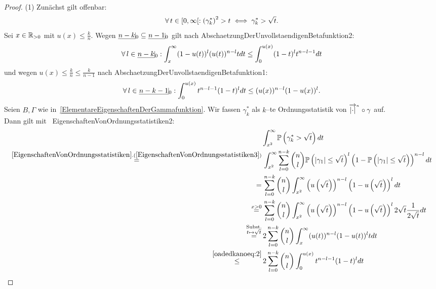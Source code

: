 \begin{proof}
(1) Zunächst gilt offenbar:
\begin{align}
\forall\, t \in [0, \infty[: \left(\gamma_k^\ast\right)^2 > t \iff
\gamma_k^\ast > \sqrt t \text.\label{oadedkanoeq:1}
\end{align}
Sei $x \in \mathbb{R}_{>0}$ mit $u(x) \le\frac k n $.
Wegen $\haken{n-k}_0 \subseteq \haken {n-1}_0$ gilt nach
{AbschaetzungDerUnvollstaendigenBetafunktion2}:
\begin{align}\forall\, l \in \haken {n-k}_0:
\int_x^\infty (1-u(t))^l(u(t))^{n-l}tdt
\le \int_0^{u(x)} (1-t)^lt^{n-l-1}dt \label{oadedkanoeq:2}
\end{align}
und wegen $u(x) \le \frac k n \le \frac k {n-1}$ nach
{AbschaetzungDerUnvollstaendigenBetafunktion1}:
\begin{align}\forall\, l \in \haken{n-k-1}_0:
\int_0^{u(x)} t^{n-l-1}(1-t)^ldt
\le (u(x))^{n-l}(1-u(x))^l \text.\label{oadedkanoeq:3}
\end{align}
Seien $B, \Gamma$ wie in~\ref{ElementareEigenschaftenDerGammafunktion}.
Wir fassen $\gamma_k^\ast$ als $k$--te Ordnungsstatistik von
${\overrightarrow{\left|\cdot\right|}}^{{}_n} \circ \gamma$ auf.\\
Dann gilt mit~
{EigenschaftenVonOrdnungsstatistiken2}:
\begin{align*}
& \int_{x^2}^\infty \Prim\left(\gamma_k^\ast > \sqrt t\right)dt\\
\overset{\refclaim{EigenschaftenVonOrdnungsstatistiken}
{EigenschaftenVonOrdnungsstatistiken3}}= &\,
\int_{x^2}^\infty \sum_{l=0}^{n-k}\binom n l 
\Prim\left(\abs{\gamma_1} \le\sqrt t\right)^l
\left(1-\Prim\left(\abs{\gamma_1}\le \sqrt t\right)\right)^{n-l}dt\\
=&\, \sum_{l=0}^{n-k}\binom n l \int_{x^2}^\infty 
\left(u\left(\sqrt t\right)\right)^{n-l}\left(1-u\left(\sqrt t\right)\right)^l
dt\\
\overset{x>0}=&\, \sum_{l=0}^{n-k}\binom n l \int_{x^2}^\infty 
\left(u\left(\sqrt t\right)\right)^{n-l}\left(1-u\left(\sqrt t\right)\right)^l
2\sqrt t \frac 1 {2\sqrt t}dt\\
\overset{\substack{\text{Subst.}\\t \mapsto \sqrt t}}= &\,
2\sum_{l=0}^{n-k}\binom n l \int_x^\infty (u(t))^{n-l}(1-u(t))^l tdt\\
\overset{\eqref{oadedkanoeq:2}}\le &\,
2\sum_{l=0}^{n-k}\binom n l \int_0^{u(x)} t^{n-l-1}(1-t)^ldt\\

\end{align*}
\end{proof}
